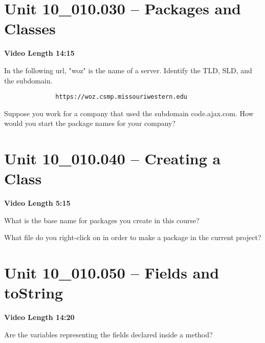 \documentclass[letterpaper,12pt]{exam}
\newcommand{\unit}{Unit 10}
\begin{document}
\begin{questions}
\section*{\unit\_010.030 -- Packages and Classes} 
\par{\selectfont\textbf{Video Length 14:15}}

\begin{samepage}
    \question In the following url, "woz" is the name of a server.  Identify the TLD, SLD, and the subdomain.
    \begin{verbatim}
              https://woz.csmp.missouriwestern.edu
    \end{verbatim}
    \vspace{5mm}
\end{samepage}

\begin{samepage}
    \question Suppose you work for a company that used the subdomain code.ajax.com.  How would you start the package names for your company?
    \vspace{5mm}
\end{samepage}


\section*{\unit\_010.040 -- Creating a Class} 
\par{\selectfont\textbf{Video Length 5:15}}

\begin{samepage}
    \question What is the base name for packages you create in this course?
    \vspace{5mm}
\end{samepage}

\begin{samepage}
    \question What file do you right-click on in order to make a package in the current project?
    \vspace{5mm}
\end{samepage}


\section*{\unit\_010.050 -- Fields and toString} 
\par{\selectfont\textbf{Video Length 14:20}}

\begin{samepage}
    \question Are the variables representing the fields declared inside a method?
    \vspace{5mm}
\end{samepage}


\end{questions}
\end{document}
